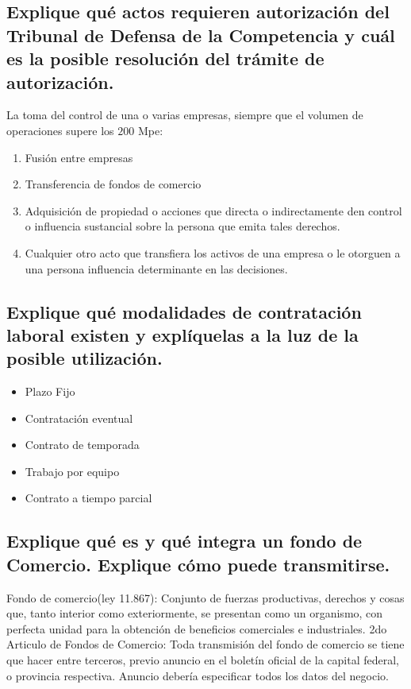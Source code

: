 \documentclass{article}
\begin{document}
\subsection{Explique qué actos requieren autorización del Tribunal de Defensa de la Competencia y cuál es la posible resolución del trámite de autorización.}
La toma del control de una o varias empresas, siempre que el volumen de operaciones supere los $200$ Mpe:
\begin{enumerate}
\item Fusión entre empresas
\item Transferencia de fondos de comercio
\item Adquisición de propiedad o acciones que directa o indirectamente den control o influencia sustancial sobre la persona que emita tales derechos.
\item Cualquier otro acto que transfiera los activos de una empresa o le otorguen a una persona influencia determinante en las decisiones.
\end{enumerate}

\subsection{Explique qué modalidades de contratación laboral existen y  explíquelas a la luz de la posible utilización.}

\begin{itemize}
\item Plazo Fijo
\item Contratación eventual
\item Contrato de temporada
\item Trabajo por equipo
\item Contrato a tiempo parcial
\end{itemize}


\subsection{Explique qué es y qué integra un fondo de Comercio. Explique cómo puede transmitirse.} \label{sec:QueEsUnFondoDeComercioYTransmision}
Fondo de comercio(ley 11.867): Conjunto de fuerzas productivas, derechos y cosas que, tanto interior como exteriormente, se presentan como un organismo, con perfecta unidad para la obtención de beneficios comerciales e industriales. 
2do Articulo de Fondos de Comercio: Toda transmisión del fondo de comercio se tiene que hacer entre terceros, previo anuncio en el boletín oficial de la capital federal, o provincia respectiva. Anuncio debería especificar todos los datos del negocio.
\end{document}
